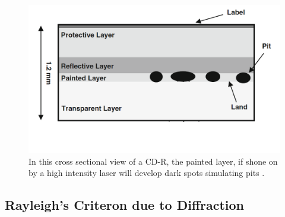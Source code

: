 \documentclass[ notitlepage, numerical, 11pt]{revtex4-1} %
\begin{document}
\begin{figure}[H]
\centerline{\includegraphics[scale=.45]{cdR.png}}
\caption{In this cross sectional view of a CD-R, the painted layer, if shone on by a high intensity laser will develop dark spots simulating pits \cite{memory}.}
\label{cdR}
\end{figure} 

\subsection{Rayleigh's Criteron due to Diffraction}
\end{document}

